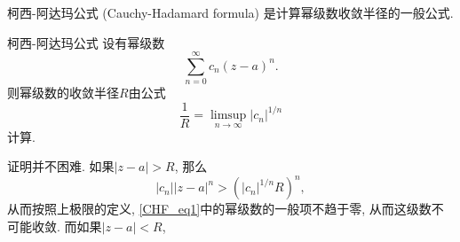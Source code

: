 
柯西-阿达玛公式 (Cauchy-Hadamard formula) 是计算幂级数收敛半径的一般公式.

\begin{theorem}{柯西-阿达玛公式}
设有幂级数
\begin{equation}\label{CHF_eq1}
\sum_{n=0}^\infty c_n(z-a)^n.
\end{equation}
则幂级数的收敛半径$R$由公式
$$
\frac{1}{R}=\limsup_{n\to\infty}|c_n|^{1/n}
$$
计算.
\end{theorem}
证明并不困难. 如果$|z-a|>R$, 那么
$$
|c_n||z-a|^n>(|c_n|^{1/n}R)^n,
$$
从而按照上极限的定义, \autoref{CHF_eq1}中的幂级数的一般项不趋于零, 从而这级数不可能收敛. 而如果$|z-a|<R$, 